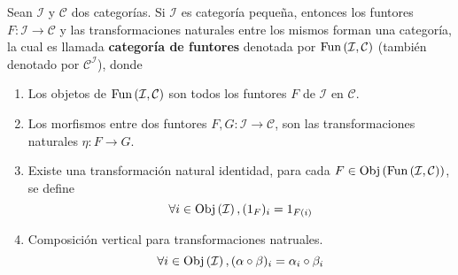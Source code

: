 \documentclass[12pt]{report}
\theoremstyle{largebreak}
\newcommand\cf[3]{\ensuremath{#1:#2\rightarrow#3}}
\newcommand{\Obj}[1]{\ensuremath{\textup{Obj}\left(#1\right)}}
\newcommand{\Fun}[2]{\ensuremath{\textup{Fun}\left(#1,#2\right)}}
\begin{document}
    \begin{propo}
        Sean $\mathcal{I}$ y $\mathcal{C}$ dos categorías. Si $\mathcal{I}$ es categoría pequeña, entonces los funtores $\cf{F}{\mathcal{I}}{\mathcal{C}}$ y las transformaciones naturales entre los mismos forman una categoría, la cual es llamada \textbf{categoría de funtores} denotada por $\Fun{\mathcal{I}}{\mathcal{C}}$ (también denotado por $\mathcal{C}^{\mathcal{I}}$), donde
        \begin{enumerate}
            \item Los objetos de $\Fun{\mathcal{I}}{\mathcal{C}}$ son todos los funtores $F$ de $\mathcal{I}$ en $\mathcal{C}$.
            \item Los morfismos entre dos funtores $\cf{F,G}{\mathcal{I}}{\mathcal{C}}$, son las transformaciones naturales $\cf{\eta}{F}{G}$.
            \item Existe una transformación natural identidad, para cada $F\in\Obj{\Fun{\mathcal{I}}{\mathcal{C}}}$, se define
            \begin{equation*}
                \forall i\in\Obj{\mathcal{I}}, (1_F)_i=1_{F(i)}
            \end{equation*}
            \item Composición vertical para transformaciones natruales.
            \begin{equation*}
                \forall i\in\Obj{\mathcal{I}}, (\alpha\circ\beta)_i=\alpha_i\circ\beta_i
            \end{equation*}
        \end{enumerate}
    \end{propo}
\end{document}
